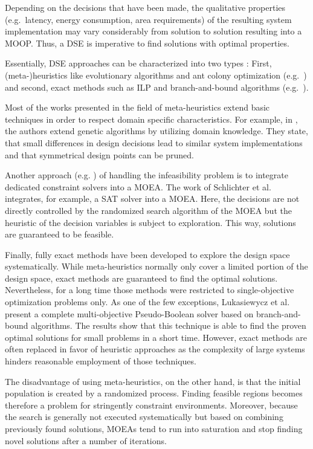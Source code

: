 Depending on the decisions that have been made, the qualitative properties (e.g.~latency, energy consumption, area requirements) of the resulting system implementation may vary considerably from solution to solution resulting into a \ac{MOOP}. Thus, a \acf{DSE} is imperative to find solutions with optimal properties. \par
Essentially, \ac{DSE} approaches can be characterized into two types \cite{Pimentel2017}: First, (meta-)heuristics like evolutionary algorithms and ant colony optimization (e.g.~\cite{Thompson2013,Ferrandi2010}) and second, exact methods such as \ac{ILP} and branch-and-bound algorithms (e.g.~\cite{Lukasiewycz2008,Khalilzad2016}). \par 
Most of the works presented in the field of meta-heuristics extend basic techniques in order to respect domain specific characteristics. For example, in \cite{Thompson2013}, the authors extend genetic algorithms by utilizing domain knowledge. They state, that small differences in design decisions lead to similar system implementations and that symmetrical design points can be pruned. \par 
Another approach (e.g. \cite{Neubauer2016,Schlichter2006}) of handling the infeasibility problem is to integrate dedicated constraint solvers into a \ac{MOEA}. The work of Schlichter et al. \cite{Schlichter2006} integrates, for example, a \ac{SAT} solver into a \ac{MOEA}. Here, the decisions are not directly controlled by the randomized search algorithm of the \ac{MOEA} but the heuristic of the decision variables is subject to exploration. This way, solutions are guaranteed to be feasible.\par
Finally, fully exact methods have been developed to explore the design space systematically. While meta-heuristics normally only cover a limited portion of the design space, exact methods are guaranteed to find the optimal solutions. Nevertheless, for a long time those methods were restricted to single-objective optimization problems only. As one of the few exceptions, Lukasiewycz et al.  \cite{Lukasiewycz2008} present a complete multi-objective Pseudo-Boolean solver based on branch-and-bound algorithms. The results show that this technique is able to find the proven optimal solutions for small problems in a short time. However, exact methods are often replaced in favor of heuristic approaches as the complexity of large systems hinders reasonable employment of those techniques. \par
The disadvantage of using meta-heuristics, on the other hand, is that the initial population is created by a randomized process. Finding feasible regions becomes therefore a problem for stringently constraint environments. Moreover, because the search is generally not executed systematically but based on combining previously found solutions, \acp{MOEA} tend to run into saturation and stop finding novel solutions after a number of iterations.\par
